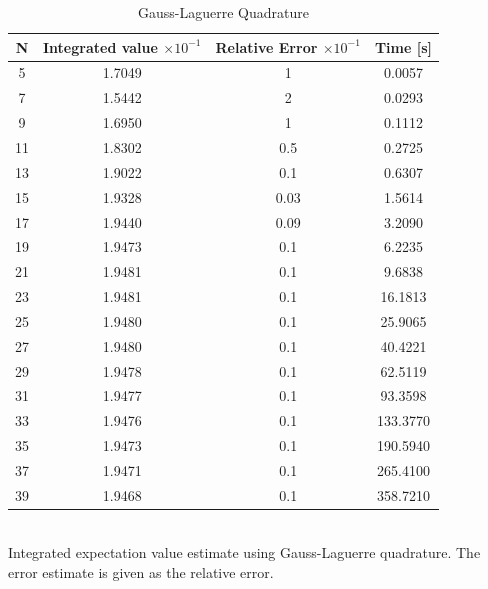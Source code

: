 \documentclass[%
reprint,nofootinbib,
amsmath,amssymb,
aps,
]{revtex4-1}
\begin{document}
\begin{table}[!h]
	\caption{Gauss-Laguerre Quadrature }
	\begin{tabular}{|c|c|c|c|}
		\hline 
		\hspace{5mm} \textbf{N} \hspace{5mm} & \textbf{Integrated value} $\times 10^{-1}$ & \textbf{Relative Error} $\times 10^{-1}$ & \hspace{3mm}\textbf{Time  [s]} \hspace{5mm}\\
		\hline 
			5 & 1.7049  & 1  & 0.0057 \\
			7 & 1.5442  & 2  & 0.0293 \\
			9 & 1.6950  & 1  & 0.1112 \\
			11 & 1.8302  & 0.5  & 0.2725 \\
			13 & 1.9022  & 0.1  & 0.6307 \\
			15 & 1.9328  & 0.03  & 1.5614 \\
			17 & 1.9440  & 0.09  & 3.2090 \\
			19 & 1.9473  & 0.1  & 6.2235 \\
			21 & 1.9481  & 0.1  & 9.6838 \\
			23 & 1.9481  & 0.1  & 16.1813 \\
			25 & 1.9480  & 0.1  & 25.9065 \\
			27 & 1.9480  & 0.1  & 40.4221 \\
			29 & 1.9478  & 0.1  & 62.5119 \\
			31 & 1.9477  & 0.1  & 93.3598 \\
			33 & 1.9476  & 0.1  & 133.3770 \\
			35 & 1.9473  & 0.1  & 190.5940 \\
			37 & 1.9471  & 0.1  & 265.4100 \\
			39 & 1.9468  & 0.1  & 358.7210 \\

		
		\hline 
	\end{tabular}
	\\ [3pt] \label{laguerre_values} \centering Integrated expectation value estimate using Gauss-Laguerre quadrature. The error estimate is given as the relative error.
\end{table}
\end{document}
